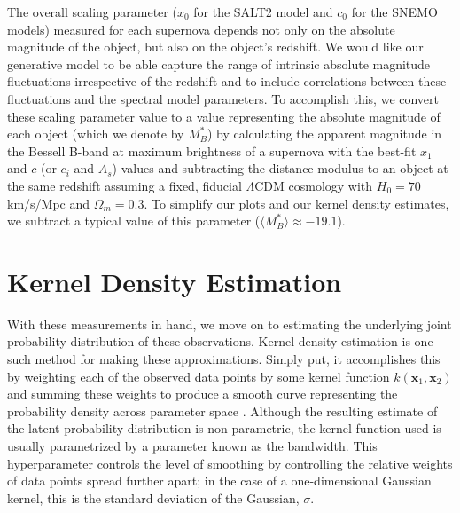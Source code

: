 The overall scaling parameter ($x_0$ for the SALT2 model and $c_0$ for the SNEMO models) measured for each supernova depends not only on the absolute magnitude of the object, but also on the object's redshift. We would like our generative model to be able capture the range of intrinsic absolute magnitude fluctuations irrespective of the redshift and to include correlations between these fluctuations and the spectral model parameters. To accomplish this, we convert these scaling parameter value to a value representing the absolute magnitude of each object (which we denote by $M_B^*$) by calculating the apparent magnitude in the Bessell B-band at maximum brightness of a supernova with the best-fit $x_1$ and $c$ (or $c_i$ and $A_s$) values and subtracting the distance modulus to an object at the same redshift assuming a fixed, fiducial $\Lambda$CDM cosmology with $H_0=70$ km/s/Mpc and $\Omega_{m}=0.3$. To simplify our plots and our kernel density estimates, we subtract a typical value of this parameter ($\langle M_B^*\rangle \approx -19.1$).


% 

\section{Kernel Density Estimation}
\label{sec:kde}
With these measurements in hand, we move on to estimating the underlying joint probability distribution of these observations. Kernel density estimation is one such method for making these approximations. Simply put, it accomplishes this by weighting each of the observed data points by some kernel function $k(\bm{x}_{1}, \bm{x}_{2})$ and summing these weights to produce a smooth curve representing the probability density across parameter space \citep{silverman_density_1986, wand_kernel_1995, scott_multivariate_2014}. Although the resulting estimate of the latent probability distribution is non-parametric, the kernel function used is usually parametrized by a parameter known as the bandwidth. This hyperparameter controls the level of smoothing by controlling the relative weights of data points spread further apart; in the case of a one-dimensional Gaussian kernel, this is the standard deviation of the Gaussian, $\sigma$.


